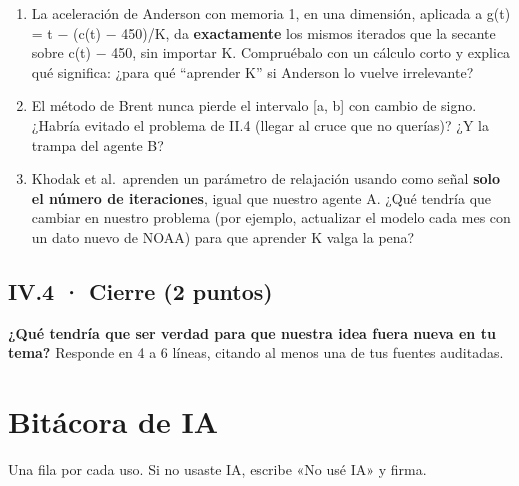 \begin{enumerate}
\def\labelenumi{\arabic{enumi}.}
\tightlist
\item
  La aceleración de Anderson con memoria 1, en una dimensión, aplicada a g(t) = t − (c(t) − 450)/K, da \textbf{exactamente} los mismos iterados que la secante sobre c(t) − 450, sin importar K. Compruébalo con un cálculo corto y explica qué significa: ¿para qué ``aprender K'' si Anderson lo vuelve irrelevante?
\item
  El método de Brent nunca pierde el intervalo {[}a, b{]} con cambio de signo. ¿Habría evitado el problema de II.4 (llegar al cruce que no querías)? ¿Y la trampa del agente B?
\item
  Khodak et al.~aprenden un parámetro de relajación usando como señal \textbf{solo el número de iteraciones}, igual que nuestro agente A. ¿Qué tendría que cambiar en nuestro problema (por ejemplo, actualizar el modelo cada mes con un dato nuevo de NOAA) para que aprender K valga la pena?
\end{enumerate}

\subsection{IV.4 · Cierre (2 puntos)}

\textbf{¿Qué tendría que ser verdad para que nuestra idea fuera nueva en tu tema?} Responde en 4 a 6 líneas, citando al menos una de tus fuentes auditadas.

\section{Bitácora de IA}

Una fila por cada uso. Si no usaste IA, escribe «No usé IA» y firma.

